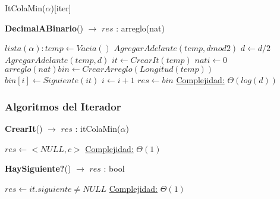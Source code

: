 \begin{Estructura}{ItColaMin($\alpha$)}[iter]
\begin{algorithm}[H]{\textbf{DecimalABinario}{(}) $\to$ $res$ : arreglo(nat)}
   	\begin{algorithmic}[1]
		\State $lista(\alpha): temp \gets Vacia() $ 
			\State $AgregarAdelante(temp, d mod 2)$ 			
			\State $d \gets d/2$ 			
		\EndWhile
		\State $AgregarAdelante(temp, d)$ 
		\State $it \gets CrearIt(temp)$ 					
		\State $nat i \gets 0$ 
		\State $arreglo(nat) bin \gets CrearArreglo(Longitud(temp)) $ 		
			\State $bin[i] \gets Siguiente(it)$ 			
			\State $i \gets i+1$ 			
		\EndWhile
		\State $res \gets bin$ 
		\Statex \underline{Complejidad:} $\Theta(log(d))$
   	\end{algorithmic}
\end{algorithm}    

\subsubsection{Algoritmos del Iterador}

\begin{algorithm}[H]{\textbf{CrearIt}() $\to$ $res$ : itColaMin($\alpha$)}
   	\begin{algorithmic}[1]
			\State $res \gets <NULL, c>$ 
			\Statex \underline{Complejidad:} $\Theta(1)$
   	\end{algorithmic}
\end{algorithm}    	

\begin{algorithm}[H]{\textbf{HaySiguiente?}() $\to$ $res$ : bool}
   	\begin{algorithmic}[1]
			\State $res \gets it.siguiente \neq NULL $ 
			\Statex \underline{Complejidad:} $\Theta(1)$
   	\end{algorithmic}
\end{algorithm}  


\end{Estructura}
